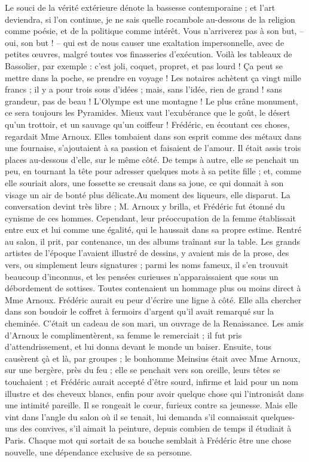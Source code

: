 Le souci de la vérité extérieure dénote la bassesse contemporaine ; et l’art deviendra, si l’on continue, je ne sais quelle rocambole au-dessous de la religion comme poésie, et de la politique comme intérêt. Vous n’arriverez pas à son but, – oui, son but ! – qui est de nous causer une exaltation impersonnelle, avec de petites œuvres, malgré toutes vos finasseries d’exécution. Voilà les tableaux de Bassolier, par exemple : c’est joli, coquet, propret, et pas lourd ! Ça peut se mettre dans la poche, se prendre en voyage ! Les notaires achètent ça vingt mille francs ; il y a pour trois sous d’idées ; mais, sans l’idée, rien de grand ! sans grandeur, pas de beau ! L’Olympe est une montagne ! Le plus crâne monument, ce sera toujours les Pyramides. Mieux vaut l’exubérance que le goût, le désert qu’un trottoir, et un sauvage qu’un coiffeur ! Frédéric, en écoutant ces choses, regardait Mme Arnoux. Elles tombaient dans son esprit comme des métaux dans une fournaise, s’ajoutaient à sa passion et faisaient de l’amour. Il était assis trois places au-dessous d’elle, sur le même côté. De temps à autre, elle se penchait un peu, en tournant la tête pour adresser quelques mots à sa petite fille ; et, comme elle souriait alors, une fossette se creusait dans sa joue, ce qui donnait à son visage un air de bonté plus délicate.Au moment des liqueurs, elle disparut. La conversation devint très libre ; M. Arnoux y brilla, et Frédéric fut étonné du cynisme de ces hommes. Cependant, leur préoccupation de la femme établissait entre eux et lui comme une égalité, qui le haussait dans sa propre estime. Rentré au salon, il prit, par contenance, un des albums traînant sur la table. Les grands artistes de l’époque l’avaient illustré de dessins, y avaient mis de la prose, des vers, ou simplement leurs signatures ; parmi les noms fameux, il s’en trouvait beaucoup d’inconnus, et les pensées curieuses n’apparaissaient que sous un débordement de sottises. Toutes contenaient un hommage plus ou moins direct à Mme Arnoux. Frédéric aurait eu peur d’écrire une ligne à côté. Elle alla chercher dans son boudoir le coffret à fermoirs d’argent qu’il avait remarqué sur la cheminée. C’était un cadeau de son mari, un ouvrage de la Renaissance. Les amis d’Arnoux le complimentèrent, sa femme le remerciait ; il fut pris d’attendrissement, et lui donna devant le monde un baiser. Ensuite, tous causèrent çà et là, par groupes ; le bonhomme Meinsius était avec Mme Arnoux, sur une bergère, près du feu ; elle se penchait vers son oreille, leurs têtes se touchaient ; et Frédéric aurait accepté d’être sourd, infirme et laid pour un nom illustre et des cheveux blancs, enfin pour avoir quelque chose qui l’intronisât dans une intimité pareille. Il se rongeait le cœur, furieux contre sa jeunesse. Mais elle vint dans l’angle du salon où il se tenait, lui demanda s’il connaissait quelques-uns des convives, s’il aimait la peinture, depuis combien de temps il étudiait à Paris. Chaque mot qui sortait de sa bouche semblait à Frédéric être une chose nouvelle, une dépendance exclusive de sa personne.

